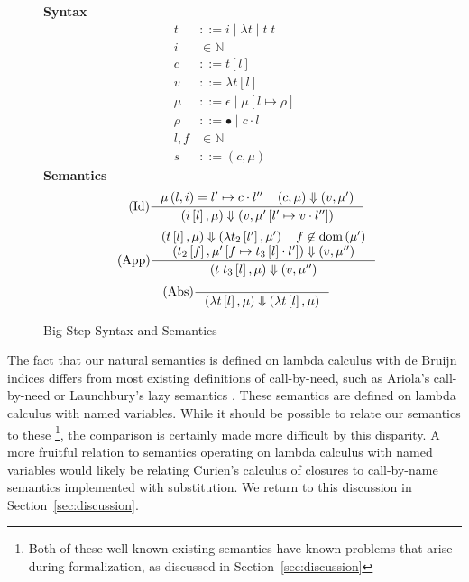 \begin{figure}
\textbf{Syntax}
\begin{align*}
\tag{Term} t &::= i \; | \; \lambda t \; | \; t \; t  \\
\tag{Variable} i &\in \mathbb{N}  \\
\tag{Closure} c &::= t \left[l\right] \\
\tag{Value} v &::= \lambda t \left[l\right] \\
\tag{Heap} \mu &::= \epsilon \; | \; \mu \left[ l \mapsto \rho \right] \\
\tag{Environment} \rho &::= \bullet \; | \; c \cdot l \\
\tag{Location} l,f &\in \mathbb{N}  \\
\tag{State} s &::= \left(c, \mu \right)
\end{align*}
\textbf{Semantics}
\begin{align*}
\tag{Id} \inference
{\mu \left( l, i \right) = l' \mapsto c \cdot l'' \quad 
 \left(c, \mu\right) \Downarrow \left(v, \mu'\right)}
{\left(i\left[l\right],\mu\right) \Downarrow \left(v, \mu'\left[l' \mapsto v \cdot l''\right]\right)}
\end{align*}
\begin{align*}
\tag{App} \inference
{\left(t\left[l\right], \mu\right) \Downarrow \left(\lambda t_2\left[l'\right], \mu'\right) 
   \quad f \not \in \textnormal{dom}\left(\mu'\right)
   \\ \left(t_2\left[f\right], \mu'\left[f \mapsto t_3\left[l\right] \cdot l'\right]\right)
         \Downarrow 
      \left(v, \mu'' \right) 
   }
{\left(t \; t_3\left[l\right], \mu\right) \Downarrow \left(v, \mu'' \right)}  
\end{align*}
\begin{align*}
\tag{Abs} \inference {} {\left(\lambda t\left[l\right], \mu\right) \Downarrow \left(\lambda t\left[l\right], \mu\right)}
\end{align*}
\caption{Big Step \ce Syntax and Semantics}
\label{fig:bigstep}
\end{figure}

The fact that our natural semantics is defined on lambda calculus with de Bruijn
indices differs from most existing definitions of call-by-need, such as
Ariola's call-by-need \cite{ariola1995call} or Launchbury's lazy semantics
\cite{launchburynatural}. These semantics are defined on lambda calculus with named
variables. While it should be possible to relate our semantics to these
\footnote{Both of these well known existing semantics have known problems that
arise during formalization, as discussed in Section~\ref{sec:discussion}}, the
comparison is certainly made more difficult by this disparity. A more fruitful
relation to semantics operating on lambda calculus with named variables would
likely be relating Curien's calculus of closures to call-by-name semantics
implemented with substitution. We return to this discussion in
Section~\ref{sec:discussion}.


